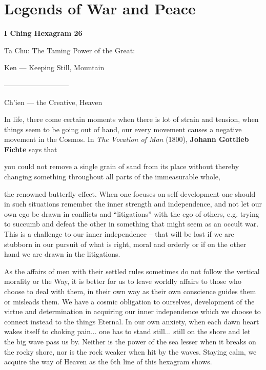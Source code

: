 \section{Legends of War and Peace}

\textbf{I Ching Hexagram 26}

Ta Chu: The Taming Power of the Great:

Ken --- Keeping Still, Mountain

---------------------------

Ch'ien --- the Creative, Heaven

In life, there come certain moments when there is lot of strain and tension, when things seem to be going out of hand, our every movement causes a negative movement in the Cosmos. In \emph{The Vocation of Man} (1800), \textbf{Johann Gottlieb Fichte} says that

\begin{quotex}
you could not remove a single grain of sand from its place without thereby changing something throughout all parts of the immeasurable whole,
\end{quotex}


the renowned butterfly effect. When one focuses on self-development one should in such situations remember the inner strength and independence, and not let our own ego be drawn in conflicts and ``litigations'' with the ego of others, e.g. trying to succumb and defeat the other in something that might seem as an occult war. This is a challenge to our inner independence -- that will be lost if we are stubborn in our pursuit of what is right, moral and orderly or if on the other hand we are drawn in the litigations.

As the affairs of men with their settled rules sometimes do not follow the vertical morality or the Way, it is better for us to leave worldly affairs to those who choose to deal with them, in their own way as their own conscience guides them or misleads them. We have a cosmic obligation to ourselves, development of the virtue and determination in acquiring our inner independence which we choose to connect instead to the things Eternal. In our own anxiety, when each dawn heart wakes itself to choking pain... one has to stand still... still on the shore and let the big wave pass us by. Neither is the power of the sea lesser when it breaks on the rocky shore, nor is the rock weaker when hit by the waves. Staying calm, we acquire the way of Heaven as the 6th line of this hexagram shows.


